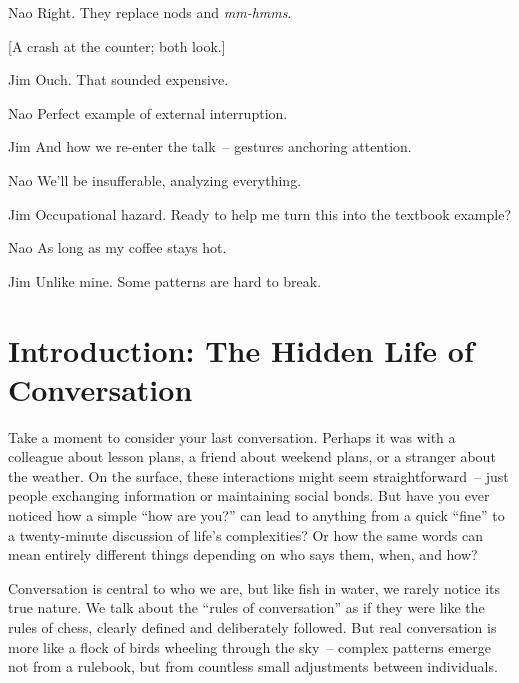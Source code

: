 \begin{sloppypar}
\begin{dialogue}
\item[Nao] Right. They replace nods and \textit{mm-hmms}. 

[A crash at the counter; both look.]

\item[Jim] Ouch. That sounded expensive.

\item[Nao] Perfect example of external interruption.

\item[Jim] And how we re-enter the talk~-- gestures anchoring attention.

\item[Nao] We'll be insufferable, analyzing everything.

\item[Jim] Occupational hazard. Ready to help me turn this into the textbook example?

\item[Nao] As long as my coffee stays hot.

\item[Jim] Unlike mine. Some patterns are hard to break.
\end{dialogue}

\end{sloppypar}

\section{Introduction: The Hidden Life of Conversation} \label{sec:intro-hidden}

Take a moment to consider your last conversation. Perhaps it was with a colleague about lesson plans, a friend about weekend plans, or a stranger about the weather. On the surface, these interactions might seem straightforward~-- just people exchanging information or maintaining social bonds. But have you ever noticed how a simple ``how are you?'' can lead to anything from a quick ``fine'' to a twenty-minute discussion of life's complexities? Or how the same words can mean entirely different things depending on who says them, when, and how?

Conversation is central to who we are, but like fish in water, we rarely notice its true nature. We talk about the ``rules of conversation'' as if they were like the rules of chess, clearly defined and deliberately followed. But real conversation is more like a flock of birds wheeling through the sky~-- complex patterns emerge not from a rulebook, but from countless small adjustments between individuals.


